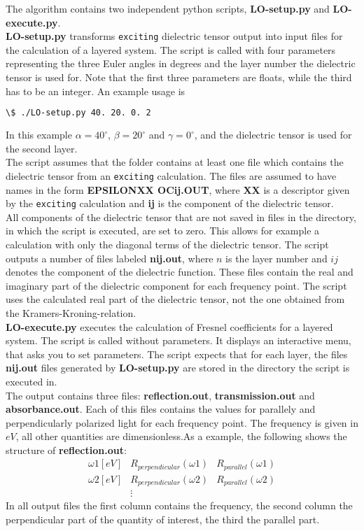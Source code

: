 \documentclass[11pt]{article}
\begin{document}
The algorithm contains two independent python scripts, \textbf{LO-setup.py} and \textbf{LO-execute.py}.\\
\textbf{LO-setup.py} transforms \texttt{exciting} dielectric tensor output into input files for the calculation of a layered system. The script is called with four parameters representing the three Euler angles in degrees and the layer number the dielectric tensor is used for. Note that the first three parameters are floats, while the third has to be an integer. An example usage is
\begin{lstlisting}[language=bash]
\$ ./LO-setup.py 40. 20. 0. 2
\end{lstlisting}
In this example $\alpha=40^{\circ}$, $\beta=20^{\circ}$ and $\gamma=0^{\circ}$, and the dielectric tensor is used for the second layer.\\
The script assumes that the folder contains at least one file which contains the dielectric tensor from an \texttt{exciting} calculation. The files are assumed to have names in the form \textbf{EPSILON\textunderscore XX \textunderscore OCij.OUT}, where \textbf{XX} is a descriptor given by the \texttt{exciting} calculation and \textbf{ij} is the component of the dielectric tensor.\\
All components of the dielectric tensor that are not saved in files in the directory, in which the script is executed, are set to zero. This allows for example a calculation with only the diagonal terms of the dielectric tensor.
The script outputs a number of files labeled \textbf{n\textunderscore ij.out}, where $n$ is the layer number and $ij$ denotes the component of the dielectric function. These files contain the real and imaginary part of the dielectric component for each frequency point. The script uses the calculated real part of the dielectric tensor, not the one obtained from the Kramers-Kroning-relation.\\
\textbf{LO-execute.py} executes the calculation of Fresnel coefficients for a layered system. The script is called without parameters. It displays an interactive menu, that asks you to set parameters. The script expects that for each layer, the files \textbf{n\textunderscore ij.out} files generated by \textbf{LO-setup.py} are stored in the directory the script is executed in.\\
The output contains three files: \textbf{reflection.out}, \textbf{transmission.out} and \textbf{absorbance.out}.
Each of this files contains the values for parallely and perpendicularly polarized light for each frequency point.
The frequency is given in $eV$, all other quantities are dimensionless.As a example, the following shows the structure of \textbf{reflection.out}:
\begin{equation}
\begin{array}{ccc}
\omega 1 [eV] & R_{perpendicular}(\omega 1) & R_{parallel}(\omega 1) \\
\omega 2 [eV] & R_{perpendicular}(\omega 2) & R_{parallel}(\omega 2) \\
 & \vdots &
\end{array}
\end{equation} 
In all output files the first column contains the frequency, the second column the perpendicular part of the quantity of interest, the third the parallel part.
\end{document}
